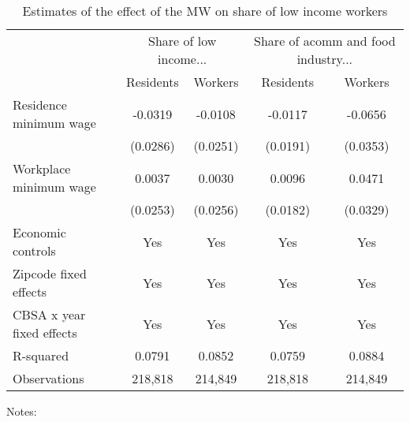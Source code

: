 \begin{table}[hbt!] \centering
    \caption{Estimates of the effect of the MW on share of low income workers}
    \label{tab:share_migration}
    \begin{tabular}{lcccc}
        \toprule 
        & \multicolumn{2}{c}{Share of low income...}  & \multicolumn{2}{c}{Share of acomm and food industry...}\\ \cmidrule(lr){2-3} \cmidrule(lr){4-5}
                 & Residents & Workers & Residents & Workers\\  \midrule
        Residence minimum wage & -0.0319 & -0.0108 & -0.0117 & -0.0656 \\
                               & (0.0286) & (0.0251) & (0.0191) & (0.0353) \\
        Workplace minimum wage & 0.0037 & 0.0030 & 0.0096 & 0.0471 \\
                               & (0.0253) & (0.0256) & (0.0182) &  (0.0329)\\  \midrule
        Economic controls                  &  Yes   &  Yes   &  Yes  &  Yes  \\
        Zipcode fixed effects              &  Yes   &  Yes   &  Yes  &  Yes  \\
        CBSA x year fixed effects          &  Yes   &  Yes   &  Yes  &  Yes  \\
        R-squared                          &  0.0791   &  0.0852   &  0.0759  &  0.0884  \\
        Observations                       &  218,818  &  214,849  &  218,818 &  214,849  
        \\\bottomrule
    \end{tabular}

    
    \begin{minipage}{.95\textwidth} \footnotesize
        \vspace{2mm}
        Notes:
    \end{minipage}
\end{table}

